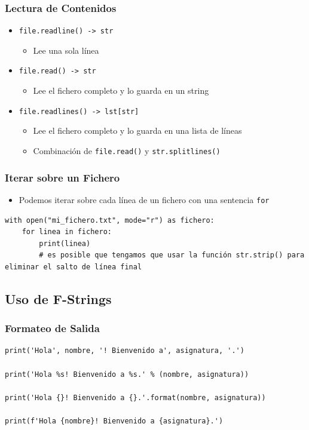 \documentclass[11pt]{beamer}
\begin{document}
\begin{frame}[fragile]\frametitle{Lectura de Contenidos}
\begin{itemize}
\item \lstinline|file.readline() -> str|
    \begin{itemize}
    \item Lee una sola línea
    \end{itemize}
\item \lstinline|file.read() -> str|
    \begin{itemize}
        \item Lee el fichero completo y lo guarda en un string
    \end{itemize}
\item \lstinline|file.readlines() -> lst[str]|
    \begin{itemize}
        \item Lee el fichero completo y lo guarda en una lista de líneas
        \item Combinación de \lstinline|file.read()| y \lstinline|str.splitlines()|
    \end{itemize}
\end{itemize}
\end{frame}


\begin{frame}[fragile]\frametitle{Iterar sobre un Fichero}
\begin{itemize}
\item Podemos iterar sobre cada línea de un fichero con una sentencia \lstinline|for|
\end{itemize}
\begin{lstlisting}[basicstyle=\small]
with open("mi_fichero.txt", mode="r") as fichero:
    for linea in fichero:
        print(linea)
        # es posible que tengamos que usar la función str.strip() para eliminar el salto de línea final
\end{lstlisting}
\end{frame}



\subsection{Uso de F-Strings}

\begin{frame}[fragile]\frametitle{Formateo de Salida}
\begin{lstlisting}[basicstyle=\small]
print('Hola', nombre, '! Bienvenido a', asignatura, '.')

print('Hola %s! Bienvenido a %s.' % (nombre, asignatura))

print('Hola {}! Bienvenido a {}.'.format(nombre, asignatura))

print(f'Hola {nombre}! Bienvenido a {asignatura}.')
\end{lstlisting}
\end{frame}
\end{document}
